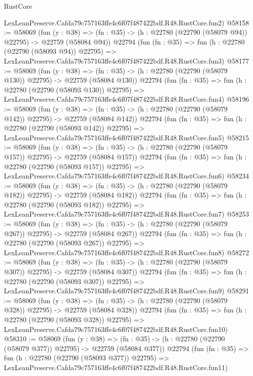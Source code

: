 \begin{lexlean}{RustCore}
\begin{coremodule}
    LexLeanPreserve.Cafda79c757163ffe4c6f07f487422bdf.R48.RustCore.fun2)
@58158 := @58069
    (fun (y : @38) =>
    (fn : @35) -> (h : @22780 (@22790 (@58079 @94)) @22795) -> @22759 (@58084 @94))
    @22794
    (fun (fn : @35) =>
    fun (h : @22780 (@22790 (@58093 @94)) @22795) =>
    LexLeanPreserve.Cafda79c757163ffe4c6f07f487422bdf.R48.RustCore.fun3)
@58177 := @58069
    (fun (y : @38) =>
    (fn : @35) -> (h : @22780 (@22790 (@58079 @130)) @22795) -> @22759 (@58084 @130))
    @22794
    (fun (fn : @35) =>
    fun (h : @22780 (@22790 (@58093 @130)) @22795) =>
    LexLeanPreserve.Cafda79c757163ffe4c6f07f487422bdf.R48.RustCore.fun4)
@58196 := @58069
    (fun (y : @38) =>
    (fn : @35) -> (h : @22780 (@22790 (@58079 @142)) @22795) -> @22759 (@58084 @142))
    @22794
    (fun (fn : @35) =>
    fun (h : @22780 (@22790 (@58093 @142)) @22795) =>
    LexLeanPreserve.Cafda79c757163ffe4c6f07f487422bdf.R48.RustCore.fun5)
@58215 := @58069
    (fun (y : @38) =>
    (fn : @35) -> (h : @22780 (@22790 (@58079 @157)) @22795) -> @22759 (@58084 @157))
    @22794
    (fun (fn : @35) =>
    fun (h : @22780 (@22790 (@58093 @157)) @22795) =>
    LexLeanPreserve.Cafda79c757163ffe4c6f07f487422bdf.R48.RustCore.fun6)
@58234 := @58069
    (fun (y : @38) =>
    (fn : @35) -> (h : @22780 (@22790 (@58079 @182)) @22795) -> @22759 (@58084 @182))
    @22794
    (fun (fn : @35) =>
    fun (h : @22780 (@22790 (@58093 @182)) @22795) =>
    LexLeanPreserve.Cafda79c757163ffe4c6f07f487422bdf.R48.RustCore.fun7)
@58253 := @58069
    (fun (y : @38) =>
    (fn : @35) -> (h : @22780 (@22790 (@58079 @267)) @22795) -> @22759 (@58084 @267))
    @22794
    (fun (fn : @35) =>
    fun (h : @22780 (@22790 (@58093 @267)) @22795) =>
    LexLeanPreserve.Cafda79c757163ffe4c6f07f487422bdf.R48.RustCore.fun8)
@58272 := @58069
    (fun (y : @38) =>
    (fn : @35) -> (h : @22780 (@22790 (@58079 @307)) @22795) -> @22759 (@58084 @307))
    @22794
    (fun (fn : @35) =>
    fun (h : @22780 (@22790 (@58093 @307)) @22795) =>
    LexLeanPreserve.Cafda79c757163ffe4c6f07f487422bdf.R48.RustCore.fun9)
@58291 := @58069
    (fun (y : @38) =>
    (fn : @35) -> (h : @22780 (@22790 (@58079 @328)) @22795) -> @22759 (@58084 @328))
    @22794
    (fun (fn : @35) =>
    fun (h : @22780 (@22790 (@58093 @328)) @22795) =>
    LexLeanPreserve.Cafda79c757163ffe4c6f07f487422bdf.R48.RustCore.fun10)
@58310 := @58069
    (fun (y : @38) =>
    (fn : @35) -> (h : @22780 (@22790 (@58079 @377)) @22795) -> @22759 (@58084 @377))
    @22794
    (fun (fn : @35) =>
    fun (h : @22780 (@22790 (@58093 @377)) @22795) =>
    LexLeanPreserve.Cafda79c757163ffe4c6f07f487422bdf.R48.RustCore.fun11)

\end{coremodule}
\end{lexlean}
